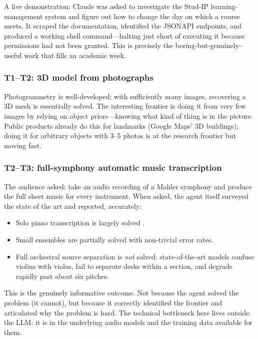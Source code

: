 A live demonstration: Claude was asked to investigate
the Stud-IP learning-management system and figure out how
to change the day on which a course meets.  It scraped the
documentation, identified the JSON\:API endpoints, and
produced a working shell command---halting just short of
executing it because permissions had not been granted.
This is precisely the boring-but-genuinely-useful work that
fills an academic week.

\subsubsection{T1--T2: 3D model from photographs}

Photogrammetry is well-developed; with sufficiently many
images, recovering a 3D mesh is essentially solved.  The
interesting frontier is doing it from very few images by
relying on object priors---knowing what kind of thing is in
the picture.  Public products already do this for
landmarks (Google Maps' 3D buildings); doing it for arbitrary
objects with $3$--$5$ photos is at the research frontier
but moving fast.

\subsubsection{T2--T3: full-symphony automatic music transcription}

The audience asked: take an audio recording of a Mahler
symphony and produce the full sheet music for every
instrument.  When asked, the agent itself surveyed the state
of the art and reported, accurately:

\begin{itemize}
  \item Solo piano transcription is largely solved
    \cite{benetos2018amt,hawthorne2018magenta}.
  \item Small ensembles are partially solved with
    non-trivial error rates.
  \item Full orchestral source separation is \emph{not}
    solved: state-of-the-art models confuse violins with
    violas, fail to separate desks within a section, and
    degrade rapidly past about six pitches.
\end{itemize}

This is the genuinely informative outcome.  Not because the
agent solved the problem (it cannot), but because it
correctly identified the frontier and articulated why the
problem is hard.  The technical bottleneck here lives outside
the LLM: it is in the underlying audio models and the
training data available for them.

